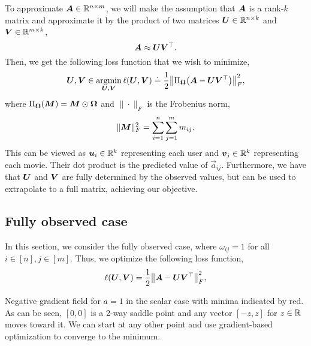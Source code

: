 To approximate $\bm{A} \in \mathbb{R}^{n \times m}$, we will make the assumption that $\bm{A}$ is a
rank-$k$ matrix and approximate it by the product of two matrices $\bm{U} \in \mathbb{R}^{n \times k}$ and
$\bm{V} \in \mathbb{R}^{m \times k}$, \[
    \bm{A} \approx \bm{U} \bm{V}^\top.
\]
Then, we get the following loss function that we wish to minimize, \[
    \mat{U}, \mat{V} \in \argmin_{\mat{U}, \mat{V}} \ell(\mat{U}, \mat{V}) \doteq \frac{1}{2} \lft\| \Pi_{\mat{\Omega}} \lft( \mat{A} - \mat{U}\transpose{\mat{V}} \rgt) \rgt\|_F^2,
\]
where $\Pi_{\bm{\Omega}}(\bm{M}) = \bm{M} \odot \bm{\Omega}$ and $\| \cdot \|_F$ is the
Frobenius norm, \[
    \| \bm{M} \|_F^2 = \sum_{i=1}^{n} \sum_{j=1}^{m} m_{ij}.
\]
This can be viewed as $\bm{u}_i \in \mathbb{R}^k$ representing each user and $\bm{v}_j \in \mathbb{R}^k$
representing each movie. Their dot product is the predicted value of $\vec{a}_{ij}$. Furthermore,
we have that $\bm{U}$ and $\bm{V}$ are fully determined by the observed values, but can be used
to extrapolate to a full matrix, achieving our objective.

\subsection{Fully observed case}

In this section, we consider the fully observed case, where $\omega_{ij}=1$ for all $i \in [n],
    j\in [m]$. Thus, we optimize \wrt the following loss function, \[
    \ell(\mat{U}, \mat{V}) = \frac{1}{2} \lft\| \mat{A} - \mat{U}\transpose{\mat{V}} \rgt\|_F^2,
\]

\begin{marginfigure}
    \centering
    \caption{Negative gradient field for $a=1$ in the scalar case with minima indicated by red. As can be seen, $[0,0]$ is a 2-way saddle point and any vector $[-z,z]$ for $z\in\mathbb{R}$ moves toward it. We can start at any other point and use gradient-based optimization to converge to the minimum.}
    \label{fig:grad-field}
\end{marginfigure}

